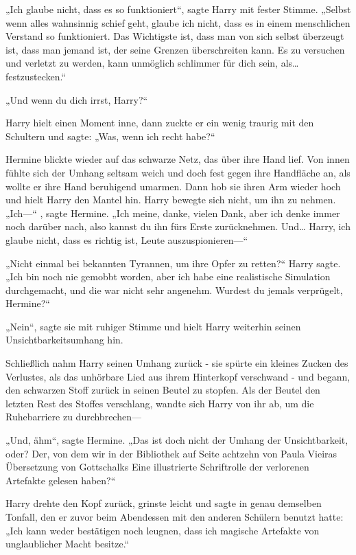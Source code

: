 {„Ich glaube nicht, dass es so funktioniert“, sagte Harry mit fester Stimme. „Selbst wenn alles wahnsinnig schief geht, glaube ich nicht, dass es in einem menschlichen Verstand so funktioniert. Das Wichtigste ist, dass man von sich selbst überzeugt ist, dass man jemand ist, der seine Grenzen überschreiten kann. Es zu versuchen und verletzt zu werden, kann unmöglich schlimmer für dich sein, als…festzustecken.“

„Und wenn du dich irrst, Harry?“

Harry hielt einen Moment inne, dann zuckte er ein wenig traurig mit den Schultern und sagte: „Was, wenn ich recht habe?“

Hermine blickte wieder auf das schwarze Netz, das über ihre Hand lief. Von innen fühlte sich der Umhang seltsam weich und doch fest gegen ihre Handfläche an, als wollte er ihre Hand beruhigend umarmen. Dann hob sie ihren Arm wieder hoch und hielt Harry den Mantel hin. Harry bewegte sich nicht, um ihn zu nehmen. „Ich—“ , sagte Hermine. „Ich meine, danke, vielen Dank, aber ich denke immer noch darüber nach, also kannst du ihn fürs Erste zurücknehmen. Und… Harry, ich glaube nicht, dass es richtig ist, Leute auszuspionieren—“

„Nicht einmal bei bekannten Tyrannen, um ihre Opfer zu retten?“ Harry sagte. „Ich bin noch nie gemobbt worden, aber ich habe eine realistische Simulation durchgemacht, und die war nicht sehr angenehm. Wurdest du jemals verprügelt, Hermine?“

„Nein“, sagte sie mit ruhiger Stimme und hielt Harry weiterhin seinen Unsichtbarkeitsumhang hin.

Schließlich nahm Harry seinen Umhang zurück - sie spürte ein kleines Zucken des Verlustes, als das unhörbare Lied aus ihrem Hinterkopf verschwand - und begann, den schwarzen Stoff zurück in seinen Beutel zu stopfen. Als der Beutel den letzten Rest des Stoffes verschlang, wandte sich Harry von ihr ab, um die Ruhebarriere zu durchbrechen—

„Und, ähm“, sagte Hermine. „Das ist doch nicht der Umhang der Unsichtbarkeit, oder? Der, von dem wir in der Bibliothek auf Seite achtzehn von Paula Vieiras Übersetzung von Gottschalks Eine illustrierte Schriftrolle der verlorenen Artefakte gelesen haben?“

Harry drehte den Kopf zurück, grinste leicht und sagte in genau demselben Tonfall, den er zuvor beim Abendessen mit den anderen Schülern benutzt hatte: „Ich kann weder bestätigen noch leugnen, dass ich magische Artefakte von unglaublicher Macht besitze.“

}
